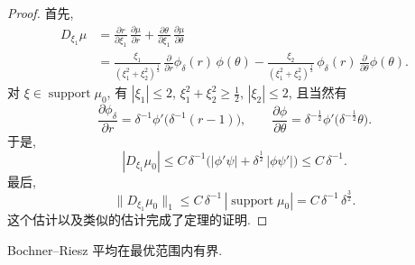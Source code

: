 \begin{proof}
首先,
\begin{align*}
D_{\xi_{1}}\mu&=\frac{\partial r}{\partial\xi_{1}}\,\frac{\partial\mu}{\partial r}
+\frac{\partial\theta}{\partial\xi_{1}}\,\frac{\partial\mu}{\partial\theta} \\
&=\frac{\xi_{1}}{(\xi_{1}^{2}+\xi_{2}^{2})^{\frac{1}{2}}}\,
\frac{\partial}{\partial r}\phi_{\delta}(r)\,\phi(\theta)
-\frac{\xi_{2}}{(\xi_{1}^{2}+\xi_{2}^{2})^{\frac{1}{2}}}\,
\phi_{\delta}(r)\,\frac{\partial}{\partial\theta}\phi(\theta).
\end{align*}
对 $\xi\in\operatorname{support}\mu_0$, 有 $|\xi_1|\leq 2$, $\xi_1^2+\xi_2^2\geq\frac{1}{2}$, $|\xi_2|\leq 2$, 且当然有
\[
\frac{\partial\phi_{\delta}}{\partial r}=\delta^{-1}\phi'\bigl(\delta^{-1}(r-1)\bigr),
\qquad
\frac{\partial\phi}{\partial\theta}=\delta^{-\frac{1}{2}}\phi'\bigl(\delta^{-\frac{1}{2}}\theta\bigr).
\]
于是,
\[
|D_{\xi_{1}}\mu_{0}|\leq C\,\delta^{-1}\bigl(|\phi'\psi|+\delta^{\frac{1}{2}}\,|\phi\psi'|\bigr)
\leq C\,\delta^{-1}.
\]
最后,
\[
\|D_{\xi_{1}}\mu_{0}\|_{1}\leq C\,\delta^{-1}\,|\operatorname{support}\mu_{0}|
=C\,\delta^{-1}\,\delta^{\frac{3}{2}}.
\]
这个估计以及类似的估计完成了定理的证明.
\end{proof}

\begin{corollary}\label{cor:8.10}
Bochner--Riesz 平均在最优范围内有界.
\end{corollary}

